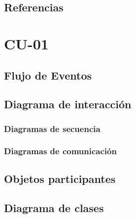 \documentclass[12pt, a4paper, titlepage]{article}
\begin{document}
\subsection{Referencias}


\section{CU-01 }


\subsection{Flujo de Eventos}



\subsection{Diagrama de interacción}



\subsubsection{Diagramas de secuencia}  



\subsubsection{Diagramas de comunicación}  


\subsection{Objetos participantes}

\subsection{Diagrama de clases}
\end{document}
